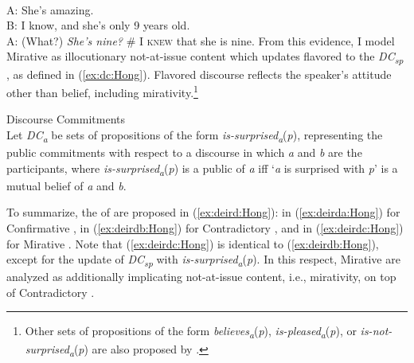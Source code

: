 \documentclass[output=paper,colorlinks,citecolor=brown]{langscibook}
\begin{document}
\ea \label{ex:mir:Hong}
    \\
    A: She’s amazing.\\
    B: I know, and she’s only 9 years old.\\
    A: (What?) \textit{She’s nine?} \# I \textsc{knew} that she is nine.
\z
From this evidence, I model Mirative  as illocutionary not-at-issue content which updates flavored  to the \textit{DC\textsubscript{sp}} \citep{rett2021semantics}, as defined in (\ref{ex:dc:Hong}). Flavored discourse  reflects the speaker's attitude other than belief, including mirativity.\footnote{Other sets of propositions of the form \textit{believes}\textit{\textsubscript{a}}(\textit{p}), \textit{is-pleased}\textit{\textsubscript{a}}(\textit{p}), or \textit{is-not-surprised}\textit{\textsubscript{a}}(\textit{p}) are also proposed by \citet{rett2021semantics}.}

\ea \label{ex:dc:Hong}
    Discourse Commitments \hfill{\citep[][326]{rett2021semantics}}\\
    Let \textit{DC\textsubscript{a}} be sets of propositions of the form \textit{is-surprised}\textit{\textsubscript{a}}(\textit{p}), representing the public commitments with respect to a discourse in which \textit{a} and \textit{b} are the participants, where
    \textit{is-surprised}\textit{\textsubscript{a}}(\textit{p}) is a public  of \textit{a} iff ‘\textit{a} is surprised with \textit{p}’ is a mutual belief of \textit{a} and \textit{b}.\\
\z

To summarize, the  of  are proposed in (\ref{ex:deird:Hong}): in (\ref{ex:deirda:Hong}) for Confirmative , in (\ref{ex:deirdb:Hong}) for Contradictory , and in (\ref{ex:deirdc:Hong}) for Mirative . Note that (\ref{ex:deirdc:Hong}) is identical to (\ref{ex:deirdb:Hong}), except for the update of \textit{DC\textsubscript{sp}} with \textit{is-surprised}\textit{\textsubscript{a}}(\textit{p}). In this respect, Mirative  are analyzed as additionally implicating not-at-issue content, i.e., mirativity, on top of Contradictory .
\end{document}
